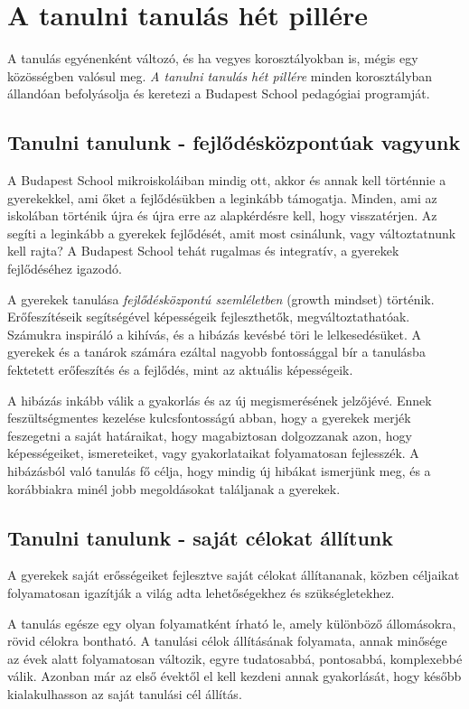 \section{A tanulni tanulás hét pillére}
A tanulás egyénenként változó, és ha vegyes korosztályokban is, mégis egy közösségben valósul meg. \emph{A tanulni tanulás hét pillére} minden korosztályban állandóan befolyásolja és keretezi a Budapest School pedagógiai programját.

\subsection{Tanulni tanulunk - fejlődésközpontúak vagyunk}
A Budapest School mikroiskoláiban mindig ott, akkor és annak kell történnie a gyerekekkel, ami őket a fejlődésükben a leginkább támogatja. Minden, ami az iskolában történik újra és újra erre az alapkérdésre kell, hogy visszatérjen. Az segíti a leginkább a gyerekek fejlődését, amit most csinálunk, vagy változtatnunk kell rajta? A Budapest School tehát rugalmas és integratív, a gyerekek fejlődéséhez igazodó.

A gyerekek tanulása \emph{fejlődésközpontú szemléletben} \citep{growthmindset} (growth mindset) történik.  Erőfeszítéseik segítségével képességeik fejleszthetők, megváltoztathatóak. Számukra inspiráló a kihívás, és a hibázás kevésbé töri le lelkesedésüket. A gyerekek és a tanárok számára ezáltal nagyobb fontossággal bír a tanulásba fektetett erőfeszítés és a fejlődés, mint az aktuális képességeik.

A hibázás inkább válik a gyakorlás és az új megismerésének jelzőjévé. Ennek feszültségmentes kezelése kulcsfontosságú abban, hogy a gyerekek merjék feszegetni a saját határaikat, hogy magabiztosan dolgozzanak azon, hogy képességeiket, ismereteiket, vagy gyakorlataikat folyamatosan fejlesszék. A hibázásból való tanulás fő célja, hogy mindig új hibákat ismerjünk meg, és a korábbiakra minél jobb megoldásokat találjanak a gyerekek.

\subsection{Tanulni tanulunk - saját célokat állítunk}
A gyerekek saját erősségeiket fejlesztve saját célokat állítananak, közben céljaikat folyamatosan igazítják a világ adta lehetőségekhez és szükségletekhez.

A tanulás egésze egy olyan folyamatként írható le, amely különböző állomásokra, rövid célokra bontható. A tanulási célok állításának folyamata, annak minősége az évek alatt folyamatosan változik, egyre tudatosabbá, pontosabbá, komplexebbé válik. Azonban már az első évektől el kell kezdeni annak gyakorlását, hogy később kialakulhasson az saját tanulási cél állítás.

